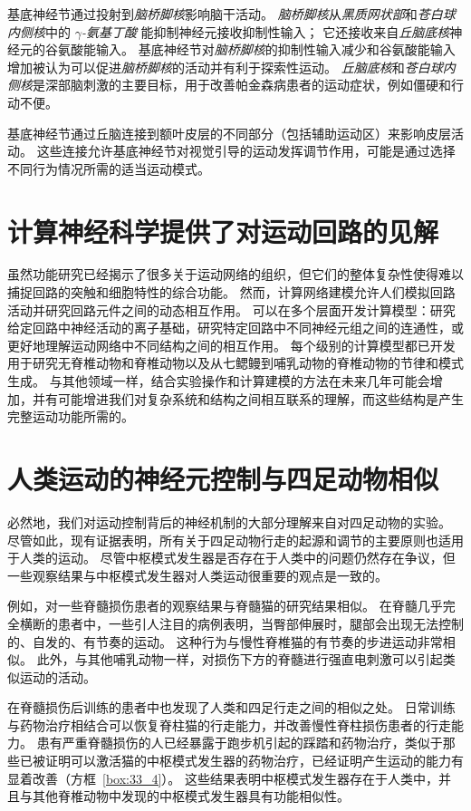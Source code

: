 基底神经节通过投射到\textit{脑桥脚核}影响脑干活动。
\textit{脑桥脚核}从\textit{黑质网状部}和\textit{苍白球内侧核}中的 \textit{$\gamma$-氨基丁酸} 能抑制神经元接收抑制性输入；
它还接收来自\textit{丘脑底核}神经元的谷氨酸能输入。
基底神经节对\textit{脑桥脚核}的抑制性输入减少和谷氨酸能输入增加被认为可以促进\textit{脑桥脚核}的活动并有利于探索性运动。
\textit{丘脑底核}和\textit{苍白球内侧核}是深部脑刺激的主要目标，用于改善帕金森病患者的运动症状，例如僵硬和行动不便。


基底神经节通过丘脑连接到额叶皮层的不同部分（包括辅助运动区）来影响皮层活动。
这些连接允许基底神经节对视觉引导的运动发挥调节作用，可能是通过选择不同行为情况所需的适当运动模式。



\section{计算神经科学提供了对运动回路的见解}

虽然功能研究已经揭示了很多关于运动网络的组织，但它们的整体复杂性使得难以捕捉回路的突触和细胞特性的综合功能。
然而，计算网络建模允许人们模拟回路活动并研究回路元件之间的动态相互作用。
可以在多个层面开发计算模型：研究给定回路中神经活动的离子基础，研究特定回路中不同神经元组之间的连通性，或更好地理解运动网络中不同结构之间的相互作用。
每个级别的计算模型都已开发用于研究无脊椎动物和脊椎动物以及从七鳃鳗到哺乳动物的脊椎动物的节律和模式生成。
与其他领域一样，结合实验操作和计算建模的方法在未来几年可能会增加，并有可能增进我们对复杂系统和结构之间相互联系的理解，而这些结构是产生完整运动功能所需的。


\section{人类运动的神经元控制与四足动物相似}

必然地，我们对运动控制背后的神经机制的大部分理解来自对四足动物的实验。
尽管如此，现有证据表明，所有关于四足动物行走的起源和调节的主要原则也适用于人类的运动。
尽管中枢模式发生器是否存在于人类中的问题仍然存在争议，但一些观察结果与中枢模式发生器对人类运动很重要的观点是一致的。


例如，对一些脊髓损伤患者的观察结果与脊髓猫的研究结果相似。
在脊髓几乎完全横断的患者中，一些引人注目的病例表明，当臀部伸展时，腿部会出现无法控制的、自发的、有节奏的运动。
这种行为与慢性脊椎猫的有节奏的步进运动非常相似。
此外，与其他哺乳动物一样，对损伤下方的脊髓进行强直电刺激可以引起类似运动的活动。


在脊髓损伤后训练的患者中也发现了人类和四足行走之间的相似之处。
日常训练与药物治疗相结合可以恢复脊柱猫的行走能力，并改善慢性脊柱损伤患者的行走能力。
患有严重脊髓损伤的人已经暴露于跑步机引起的踩踏和药物治疗，类似于那些已被证明可以激活猫的中枢模式发生器的药物治疗，已经证明产生运动的能力有显着改善（方框~\ref{box:33_4}）。
这些结果表明中枢模式发生器存在于人类中，并且与其他脊椎动物中发现的中枢模式发生器具有功能相似性。



